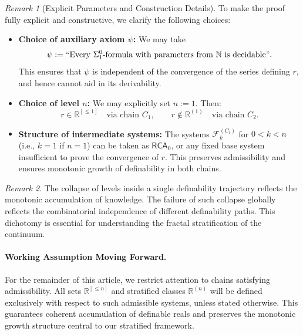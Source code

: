 \documentclass[12pt]{article}
\theoremstyle{definition}
\theoremstyle{plain}
\theoremstyle{remark}
\newtheorem*{remark}{Remark}
\begin{document}
\begin{remark}[Explicit Parameters and Construction Details]
To make the proof fully explicit and constructive, we clarify the following choices:

\begin{itemize}
    \item[\textbf{(a)}] \textbf{Choice of auxiliary axiom \( \psi \):} We may take
    \[
        \psi := \text{``Every \( \Sigma^0_1 \)-formula with parameters from \( \mathbb{N} \) is decidable''}.
    \]
    This ensures that \( \psi \) is independent of the convergence of the series defining \( r \), and hence cannot aid in its derivability.

    \item[\textbf{(b)}] \textbf{Choice of level \( n \):} We may explicitly set \( n := 1 \). Then:
    \[
        r \in \mathbb{R}^{[\leq 1]} \quad \text{via chain } C_1, \qquad r \notin \mathbb{R}^{(1)} \quad \text{via chain } C_2.
    \]

    \item[\textbf{(c)}] \textbf{Structure of intermediate systems:} The systems \( \mathcal{F}_k^{(C_i)} \) for \( 0 < k < n \) (i.e., \( k = 1 \) if \( n = 1 \)) can be taken as \( \mathsf{RCA}_0 \), or any fixed base system insufficient to prove the convergence of \( r \). This preserves admissibility and ensures monotonic growth of definability in both chains.
\end{itemize}
\end{remark}

\begin{remark}
The collapse of levels inside a single definability trajectory reflects the monotonic accumulation of knowledge. The failure of such collapse globally reflects the combinatorial independence of different definability paths. This dichotomy is essential for understanding the fractal stratification of the continuum.
\end{remark}

\paragraph{Working Assumption Moving Forward.}
For the remainder of this article, we restrict attention to chains satisfying admissibility. All sets \( \mathbb{R}^{[\leq n]} \) and stratified classes \( \mathbb{R}^{(n)} \) will be defined exclusively with respect to such admissible systems, unless stated otherwise. This guarantees coherent accumulation of definable reals and preserves the monotonic growth structure central to our stratified framework.
\end{document}
